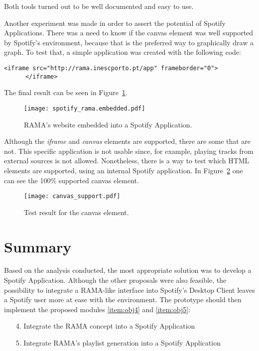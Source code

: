     Both tools turned out to be well documented and easy to use.

    \clearpage

    Another experiment was made in order to assert the potential of Spotify Applications.
    There was a need to know if the canvas element was well supported by Spotify's environment, because that is the preferred way to graphically draw a graph.
    To test that, a simple application was created with the following code:

    \begin{lstlisting}[caption={\emph{iframe} element that allows to embed RAMA's website into the application.}, style=htmlcssjs, captionpos=b]
      <iframe src="http://rama.inescporto.pt/app" frameborder="0">
      </iframe>\end{lstlisting}

    The final result can be seen in Figure~\ref{fig:rama_spotifyed}.
    \begin{figure}[H]
      \begin{center}
        \texttt{[image: spotify\_rama.embedded.pdf]}
      \end{center}
      \caption{RAMA's website embedded into a Spotify Application.}
      \label{fig:rama_spotifyed}
    \end{figure}
    Although the \emph{iframe} and \emph{canvas} elements are supported, there are some that are not.
    This specific application is not usable since, for example, playing tracks from external sources is not allowed.
    Nonetheless, there is a way to test which HTML elements are supported, using an internal Spotify application.
    In Figure~\ref{fig:canvas_support} one can see the 100\% supported canvas element.

    \begin{figure}[H]
       \begin{center}
         \texttt{[image: canvas\_support.pdf]}
       \end{center}
       \caption{Test result for the canvas element.}
       \label{fig:canvas_support}
     \end{figure}


\section{Summary}

  Based on the analysis conducted, the most appropriate solution was to develop a Spotify Application.
  Although the other proposals were also feasible, the possibility to integrate a RAMA-like interface into Spotify's Desktop Client leaves a Spotify user more at ease with the environment.
  The prototype should then implement the proposed modules \ref{item:obj4} and \ref{item:obj5}:

  \begin{itemize}
    \item[4.] Integrate the RAMA concept into a Spotify Application
    \item[5.] Integrate RAMA's playlist generation into a Spotify Application
  \end{itemize}
